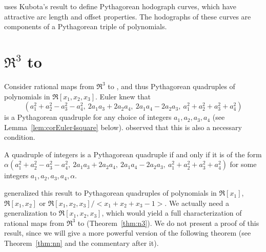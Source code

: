 \begin{example}
\cite{farouki90} uses Kubota's result to define Pythagorean hodograph curves, 
which have attractive arc length and offset properties.
The hodographs of these curves are components of a Pythagorean triple
of polynomials.
\end{example}

\vspace{.5in}

\section{$\Re^{3}$ to }
\label{sec:n3}

Consider rational maps from $\Re^3$ to ,
and thus Pythagorean quadruples of polynomials in \linebreak $\Re[x_1,x_2,x_3]$.
Euler knew that 
\[ (a_1^2+a_2^2-a_3^2-a_4^2,\ 2a_1a_3+2a_2a_4,\ 2a_1a_4-2a_2a_3,
    \ a_1^2+a_2^2+a_3^2+a_4^2)
\]
is a Pythagorean quadruple for any choice of integers $a_1,a_2,a_3,a_4$
(see Lemma~\ref{lem:corEuler4square} below).
\linebreak
\cite{catalan85} observed that this is also a necessary condition.
%
\begin{lemma}[Catalan 1885]
\label{lem:catalan}
A quadruple of integers is a Pythagorean quadruple
if and only if it is of the form
$\alpha (a_1^2+a_2^2-a_3^2-a_4^2,\ 2a_1a_3+2a_2a_4,\ 2a_1a_4-2a_2a_3,
    \ a_1^2+a_2^2+a_3^2+a_4^2)$
for some integers $a_1,a_2,a_3,a_4,\alpha$.
\end{lemma}
\cite{dietz93} generalized this result to Pythagorean quadruples of
polynomials in $\Re[x_1]$, $\Re[x_1,x_2]$ or
$\Re[x_1,x_2,x_3]/<x_1+x_2+x_3-1>$.
We actually need a generalization to $\Re[x_1,x_2,x_3]$,
which would yield a full characterization of rational maps from 
$\Re^3$ to  (Theorem~\ref{thm:n3}).
We do not present a proof of this result, since we will give a more
powerful version of the following theorem (see Theorem~\ref{thm:nn} 
and the commentary after it).


